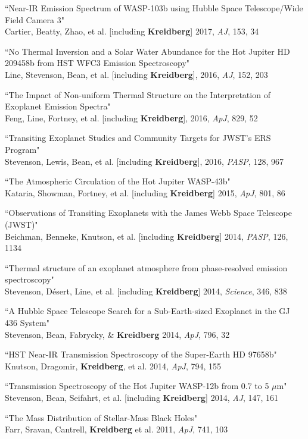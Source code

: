 \documentclass[12pt,letterpaper]{article}
\begin{document}
\begin{compactenum}
\item ``Near-IR Emission Spectrum of WASP-103b using Hubble Space Telescope/Wide Field Camera 3"\\
Cartier, Beatty, Zhao, et al. [including \textbf{Kreidberg}] 2017, \textit{AJ}, 153, 34


\item ``No Thermal Inversion and a Solar Water Abundance for the Hot Jupiter HD 209458b from HST WFC3 Emission Spectroscopy"\\
Line, Stevenson, Bean, et al. [including \textbf{Kreidberg}], 2016, \textit{AJ}, 152, 203 

\item ``The Impact of Non-uniform Thermal Structure on the Interpretation of Exoplanet Emission Spectra"\\
Feng, Line, Fortney, et al. [including \textbf{Kreidberg}], 2016, \textit{ApJ}, 829, 52

\item ``Transiting Exoplanet Studies and Community Targets for JWST's ERS Program"\\
Stevenson, Lewis, Bean, et al. [including \textbf{Kreidberg}], 2016, \textit{PASP}, 128, 967 

\item ``The Atmospheric Circulation of the Hot Jupiter WASP-43b" \\
Kataria, Showman, Fortney, et al. [including \textbf{Kreidberg}] 2015, \textit{ApJ}, 801, 86

\item ``Observations of Transiting Exoplanets with the James Webb Space Telescope (JWST)"\\
Beichman, Benneke, Knutson, et al. [including \textbf{Kreidberg}] 2014, \textit{PASP}, 126, 1134

\item ``Thermal structure of an exoplanet atmosphere from phase-resolved emission spectroscopy"\\
Stevenson, D\'esert, Line, et al. [including \textbf{Kreidberg}] 2014, \textit{Science}, 346, 838

\item ``A Hubble Space Telescope Search for a Sub-Earth-sized Exoplanet in the GJ 436 System"\\
Stevenson, Bean, Fabrycky, \& \textbf{Kreidberg} 2014, \textit{ApJ}, 796, 32

\item ``HST Near-IR Transmission Spectroscopy of the Super-Earth HD 97658b"\\
Knutson, Dragomir, \textbf{Kreidberg}, et al. 2014, \textit{ApJ}, 794, 155

\item ``Transmission Spectroscopy of the Hot Jupiter WASP-12b from 0.7 to 5 $\mu$m"\\
Stevenson, Bean, Seifahrt, et al. [including \textbf{Kreidberg}] 2014, \textit{AJ}, 147, 161

\item ``The Mass Distribution of Stellar-Mass Black Holes"\\
Farr, Sravan, Cantrell, \textbf{Kreidberg} et al. 2011, \textit{ApJ}, 741, 103
\end{compactenum}
\end{document}
